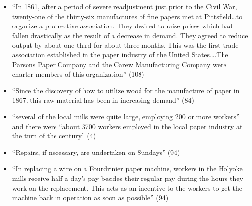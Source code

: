 \documentclass[
  letterpaper,
  DIV=11,
  numbers=noendperiod]{scrartcl}
\begin{document}
\begin{itemize}
\item
  ``In 1861, after a period of severe readjustment just prior to the
  Civil War, twenty-one of the thirty-six manufactures of fine papers
  met at Pittsfield\ldots to organize a protrective association. They
  desired to raise prices which had fallen drastically as the result of
  a decrease in demand. They agreed to reduce output by about one-third
  for about three months. This was the first trade association
  established in the paper industry of the United States\ldots.The
  Parsons Paper Company and the Carew Manufacturing Company were charter
  members of this organization'' (108)
\item
  ``Since the discovery of how to utilize wood for the manufacture of
  paper in 1867, this raw material has been in increasing demand'' (84)
\item
  ``several of the local mills were quite large, employing 200 or more
  workers'' and there were ``about 3700 workers employed in the local
  paper industry at the turn of the century'' (4)
\item
  ``Repairs, if necessary, are undertaken on Sundays'' (94)
\item
  ``In replacing a wire on a Fourdrinier paper machine, workers in the
  Holyoke mills receive half a day's pay besides their regular pay
  during the hours they work on the replacement. This acts as an
  incentive to the workers to get the machine back in operation as soon
  as possible'' (94)
\end{itemize}
\end{document}
